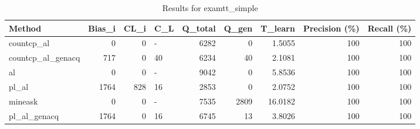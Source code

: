 \begin{table}[ht]
\caption{Results for examtt_simple}
\begin{tabular}{lrrlrrrrr}
\hline
 Method            &   Bias\_i &   CL\_i & C\_L   &   Q\_total &   Q\_gen &   T\_learn &   Precision (\%) &   Recall (\%) \\
\hline
 countcp\_al        &        0 &      0 & -     &      6282 &       0 &    1.5055 &             100 &          100 \\
 countcp\_al\_genacq &      717 &      0 & 40    &      6234 &      40 &    2.1081 &             100 &          100 \\
 al                &        0 &      0 & -     &      9042 &       0 &    5.8536 &             100 &          100 \\
 pl\_al             &     1764 &    828 & 16    &      2853 &       0 &    2.0752 &             100 &          100 \\
 mineask           &        0 &      0 & -     &      7535 &    2809 &   16.0182 &             100 &          100 \\
 pl\_al\_genacq      &     1764 &      0 & 16    &      6745 &      13 &    3.8026 &             100 &          100 \\
\hline
\end{tabular}
\end{table}